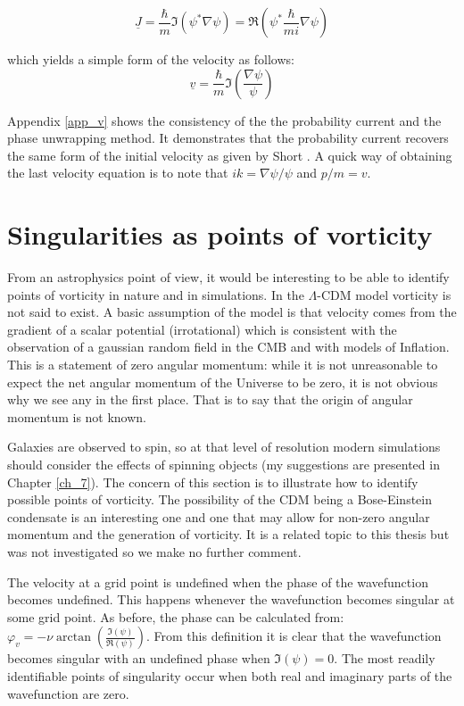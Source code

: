 \begin{equation}
\underline{J} = \frac{\hbar}{m} \Im(\psi^* \nabla \psi) = \Re(\psi^* \frac{\hbar}{mi}\nabla \psi)
\end{equation}

\noindent which yields a simple form of the velocity as follows:
\begin{equation}
\label{eqn_svel}
\underline{v} = \frac{\hbar}{m} \Im\left(\frac{\nabla \psi}{\psi}\right)
\end{equation}

\noindent Appendix \ref{app_v} shows the consistency of the the probability current and the phase unwrapping method. It demonstrates that the probability current recovers the same form of the initial velocity as given by Short \citep{bib_short}. A quick way of obtaining the last velocity equation is to note that $i k = \nabla \psi / \psi$ and $p/m = v$.


\section{Singularities as points of vorticity}
\label{vort}
From an astrophysics point of view, it would be interesting to be able to identify points of vorticity in nature and in simulations. In the $\Lambda$-CDM model vorticity is not said to exist. A basic assumption of the model is that velocity comes from the gradient of a scalar potential (irrotational) which is consistent with the observation of a gaussian random field in the CMB and with models of Inflation. This is a statement of zero angular momentum: while it is not unreasonable to expect the net angular momentum of the Universe to be zero, it is not obvious why we see any in the first place. That is to say that the origin of angular momentum is not known.

Galaxies are observed to spin, so at that level of resolution modern simulations should consider the effects of spinning objects (my suggestions are presented in Chapter \ref{ch_7}). The concern of this section is to illustrate how to identify possible points of vorticity. The possibility of the CDM being a Bose-Einstein condensate is an interesting one and one that may allow for non-zero angular momentum and the generation of vorticity. It is a related topic to this thesis but was not investigated so we make no further comment.

The velocity at a grid point is undefined when the phase of the wavefunction becomes undefined. This happens whenever the wavefunction becomes singular at some grid point. As before, the phase can be calculated from: $\varphi_{v} = - \nu \arctan\left(\frac{\Im(\psi)}{\Re(\psi)}\right)$. From this definition it is clear that the wavefunction becomes singular with an undefined phase when $\mathfrak{I}(\psi) = 0$. The most readily identifiable points of singularity occur when both real and imaginary parts of the wavefunction are zero.

